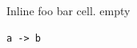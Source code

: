 \documentclass{article}
\makeatletter
\newcommand\myinline[1]{\begingroup\lsthk@PreSet\lstset{basicstyle=\ttfamily}\lsthk@TextStyle\lst@Init\relax
\let\lst@arg\@empty\lst@FVConvert#1\@nil\lst@ReenterModes\lst@arg\lst@PrintToken\lst@InterruptModes\lst@DeInit\endgroup}
\makeatother
\begin{document}
Inline \myinline{foo bar} cell. \makeatletter\lst@boxtrue\ifx\lst@label\@empty empty\fi\makeatother
\begin{lstlisting}
a -> b
\end{lstlisting}
\end{document}
